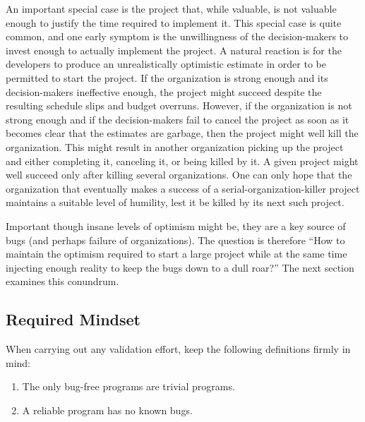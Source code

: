 An important special case is the project that, while valuable, is not
valuable enough to justify the time required to implement it.
This special case is quite common, and one early symptom is the
unwillingness of the decision-makers to invest enough to actually
implement the project.
A natural reaction is for the developers to produce an unrealistically
optimistic estimate in order to be permitted to start the project.
If the organization is strong enough and its decision-makers ineffective
enough, the project might succeed despite the resulting schedule slips
and budget overruns.
However, if the organization is not strong enough and if the decision-makers
fail to cancel the project as soon as it becomes clear that the estimates
are garbage, then the project might well kill the organization.
This might result in another organization picking up the project and
either completing it, canceling it, or being killed by it.
A given project might well succeed only after killing several
organizations.
One can only hope that the organization that eventually makes a success
of a serial-organization-killer project maintains a suitable
level of humility, lest it be killed by its next such project.

\QuickQuizEnd

Important though insane levels of optimism might be, they are a key source
of bugs (and perhaps failure of organizations).
The question is therefore ``How to maintain the optimism required to start
a large project while at the same time injecting enough reality to keep
the bugs down to a dull roar?''
The next section examines this conundrum.

\subsection{Required Mindset}
\label{sec:debugging:Required Mindset}

When carrying out any validation effort, keep the following
definitions firmly in mind:

\begin{enumerate}
\item	The only bug-free programs are trivial programs.
\item	A reliable program has no known bugs.
\end{enumerate}


